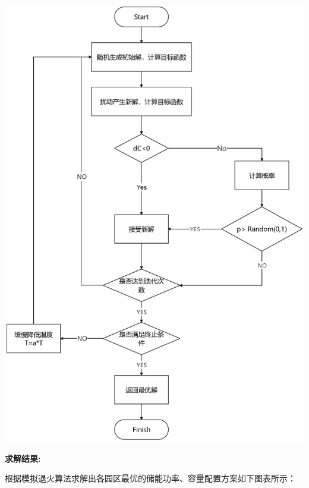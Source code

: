 \documentclass{cumcmthesis}
\begin{document}
\begin{minipage}{0.45\textwidth} %
  
\centering  
\includegraphics[width=\textwidth]{figures/退火.eps} %
  
\end{minipage}  


\textbf{求解结果:}

根据模拟退火算法求解出各园区最优的储能功率、容量配置方案如下图表所示：
\end{document}
